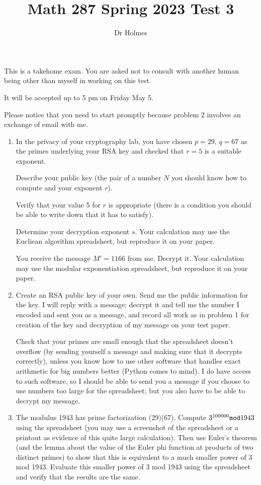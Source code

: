 \documentclass[12pt]{article}
\title{Math 287 Spring 2023 Test 3}
\author{Dr Holmes}
\begin{document}
\maketitle

This is a takehome exam.  You are asked not to consult with another human being other than myself in working on this test.

It will be accepted up to 5 pm on Friday May 5.

Please notice that you need to start promptly because problem 2 involves an exchange of email with me.

\begin{enumerate}

\item   In the privacy of your cryptography lab, you have chosen $p=29$, $q=67$  as the primes underlying your RSA key
and checked that $r=5$ is a suitable exponent.

Describe your public key (the pair of a number $N$ you should know how to compute and your exponent $r$).

Verify that your value 5 for $r$ is appropriate (there is a condition you should be able to write down that it has to satisfy).

Determine your decryption exponent $s$.  Your calculation may use the Eucliean algorithm spreadsheet, but reproduce it on your paper.

You receive the message $M'=1166$ from me.  Decrypt it.  Your calculation may use the modular exponentiation spreadsheet, but reproduce it on your paper.


\item Create an RSA public key of your own.  Send me the public information for the key.  I will reply with a message:  decrypt it and tell me the number I encoded and sent you as a message,
and record all work as in problem 1 for creation of the key and decryption of my message on your test paper.

Check that your primes are small enough that the spreadsheet doesn't overflow (by sending yourself a message and making sure that it decrypts correctly), unless you know how to use other software that handles exact arithmetic for big numbers  better (Python comes to mind).  I do have access to such software, so I should be able to send you a message if you choose to use numbers too large for the spreadsheet;  but you also have to be able to decrypt my message.

\item The modulus 1943 has prime factorization (29)(67).  Compute $3^{100000} {\tt mod} 1943$ using the spreadsheet (you may use a screenshot of the spreadsheet or a printout as evidence of this quite large calculation).  Then use Euler's theorem (and the lemma about the value of the Euler phi function at products of two distinct primes) to show that this is equivalent to a much smaller power of 3 mod 1943.  Evaluate this smaller power of 3 mod 1943 using the spreadsheet and verify that the results are the same.


\end{enumerate}
\end{document}
